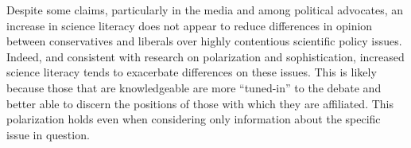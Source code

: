\documentclass[a0,final]{a0poster}
\begin{document}
\begin{multicols}{3}
\noindent Despite some claims, particularly in the media and among political advocates, an increase in science literacy does not appear to reduce differences in opinion between conservatives and liberals over highly contentious scientific policy issues. Indeed, and consistent with research on polarization and sophistication, increased science literacy tends to exacerbate differences on these issues. This is likely because those that are knowledgeable are more “tuned-in” to the debate and better able to discern the positions of those with which they are affiliated. This polarization holds even when considering only information about the specific issue in question.   

\end{multicols}
\end{document}
